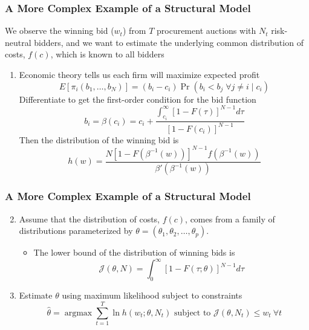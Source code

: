 \documentclass{beamer}
\DeclareMathOperator*{\argmax}{argmax}
\begin{document}
\begin{frame}\frametitle{A More Complex Example of a Structural Model}
    We observe the winning bid ($w_t$) from $T$ procurement auctions with $N_t$ risk-neutral bidders, and we want to estimate the underlying common distribution of costs, $f(c)$, which is known to all bidders
    \begin{enumerate}
        \item Economic theory tells us each firm will maximize expected profit
        $$E[\pi_i(b_1, \ldots, b_N)] = (b_i - c_i) \Pr(b_i < b_j \; \forall j \neq i \mid c_i)$$
        Differentiate to get the first-order condition for the bid function
        $$b_i = \beta(c_i) = c_i + \frac{\int_{c_i}^\infty [1 - F(\tau)]^{N - 1} d\tau}{[1 - F(c_i)]^{N - 1}}$$
        Then the distribution of the winning bid is
        $$h(w) = \frac{N [1 - F(\beta^{-1}(w))]^{N-1} f(\beta^{-1}(w))}{\beta'(\beta^{-1}(w))}$$
    \end{enumerate}
\end{frame}

\begin{frame}\frametitle{A More Complex Example of a Structural Model}
    \begin{enumerate}\setcounter{enumi}{1}
    	\item Assume that the distribution of costs, $f(c)$, comes from a family of distributions parameterized by $\theta = (\theta_1, \theta_2, \ldots, \theta_p)$. 
    	\begin{itemize}
    		\item The lower bound of the distribution of winning bids is
    	$$\mathcal{J}(\theta, N) = \int_{0}^\infty [1 - F(\tau; \theta)]^{N - 1} d\tau$$
    	\end{itemize}\item Estimate $\theta$ using maximum likelihood subject to constraints
    	$$\hat{\theta} = \argmax \sum_{t = 1}^T \ln h(w_t; \theta, N_t) \text{ subject to } \mathcal{J}(\theta, N_t) \leq w_t ~ \forall t$$
    \end{enumerate}
\end{frame}
\end{document}

